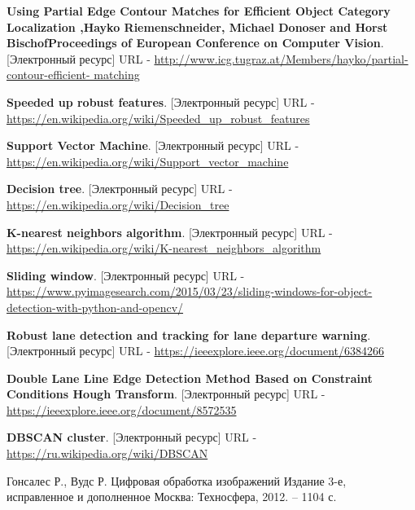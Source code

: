 \begin{thebibliography}{2}
	\textbf{Using Partial Edge Contour Matches for Efficient Object Category
		Localization ,Hayko Riemenschneider, Michael Donoser and Horst
		BischofProceedings of European Conference on Computer Vision}. [Электронный ресурс] URL - 
	\href{http://www.icg.tugraz.at/Members/hayko/partial-contour-efficient-
		matching}{http://www.icg.tugraz.at/Members/hayko/partial-contour-efficient-
		matching}
	
	\textbf{Speeded up robust features}. [Электронный ресурс] URL - 
	\href{https://en.wikipedia.org/wiki/Speeded\_up_robust\_features}{https://en.wikipedia.org/wiki/Speeded\_up\_robust\_features}
	
	\textbf{Support Vector Machine}. [Электронный ресурс] URL - 
	\href{https://en.wikipedia.org/wiki/Support\_vector\_machine}{https://en.wikipedia.org/wiki/Support\_vector\_machine}
	
	\textbf{Decision tree}. [Электронный ресурс] URL - 
	\href{https://en.wikipedia.org/wiki/Decision\_tree}{https://en.wikipedia.org/wiki/Decision\_tree}
	
	\textbf{K-nearest neighbors algorithm}. [Электронный ресурс] URL - 
	\href{https://en.wikipedia.org/wiki/K-nearest\_neighbors\_algorithm}{https://en.wikipedia.org/wiki/K-nearest\_neighbors\_algorithm}
	
	\textbf{Sliding window}. [Электронный ресурс] URL - 
	\href{https://www.pyimagesearch.com/2015/03/23/sliding-windows-for-object-detection-with-python-and-opencv/}{https://www.pyimagesearch.com/2015/03/23/sliding-windows-for-object-detection-with-python-and-opencv/}
	
	\textbf{Robust lane detection and tracking for lane departure warning}. [Электронный ресурс] URL - 
	\href{https://ieeexplore.ieee.org/document/6384266}{https://ieeexplore.ieee.org/document/6384266}
	
	\textbf{Double Lane Line Edge Detection Method Based on
		Constraint Conditions Hough Transform}. [Электронный ресурс] URL - 
	\href{https://ieeexplore.ieee.org/document/8572535}{https://ieeexplore.ieee.org/document/8572535}
	
	\textbf{DBSCAN cluster}. [Электронный ресурс] URL - 
	\href{https://ru.wikipedia.org/wiki/DBSCAN}{https://ru.wikipedia.org/wiki/DBSCAN}
	
	Гонсалес Р., Вудс Р.
	Цифровая обработка изображений
	Издание 3-е, исправленное и дополненное
	Москва: Техносфера, 2012. – 1104 с. 
	

\end{thebibliography}
